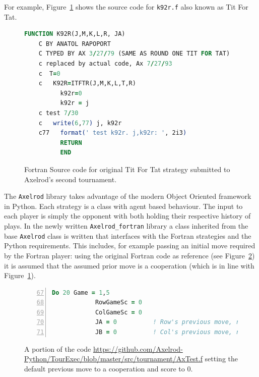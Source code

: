 \documentclass{article}
\begin{document}
For example, Figure~\ref{fig:tft_fortran} shows the source code for
\texttt{k92r.f} also known as Tit For Tat.

\begin{figure}[!hbtp]
    \begin{center}
        \begin{lstlisting}[language=Fortran,
                           basicstyle=\ttfamily,
                           frame=single,
                           keywordstyle=\color{red},
                           commentstyle=\color{green}]
          FUNCTION K92R(J,M,K,L,R, JA)
    C BY ANATOL RAPOPORT
    C TYPED BY AX 3/27/79 (SAME AS ROUND ONE TIT FOR TAT)
    c replaced by actual code, Ax 7/27/93
    c  T=0
    c   K92R=ITFTR(J,M,K,L,T,R)
          k92r=0
          k92r = j
    c test 7/30
    c   write(6,77) j, k92r
    c77   format(' test k92r. j,k92r: ', 2i3)
          RETURN
          END
        \end{lstlisting}
        \caption{Fortran Source code for original Tit For Tat strategy submitted
        to Axelrod's second tournament.}
        \label{fig:tft_fortran}
    \end{center}
\end{figure}


The \texttt{Axelrod} library takes advantage of the modern Object Oriented
framework in Python. Each strategy is a class with agent based behaviour. The
input to each player is simply the opponent with both holding their respective
history of plays. In the newly written \texttt{Axelrod\_fortran} library a
class inherited from the base \texttt{Axelrod} class is written that interfaces
with the Fortran strategies and the Python requirements. This includes, for
example passing an initial move required by the Fortran player: using the
original Fortran code as reference (see Figure~\ref{fig:tournament_code}) it
is assumed that the assumed prior move is
a cooperation (which is in line with Figure~\ref{fig:tft_fortran}).

\begin{figure}[!hbtp]
    \begin{center}
        \begin{lstlisting}[language=Fortran,
                           basicstyle=\ttfamily,
                           frame=single,
                           keywordstyle=\color{red},
                           numbers=left,
                           firstnumber=67,
                           commentstyle=\color{green}]
      Do 20 Game = 1,5
            RowGameSc = 0
            ColGameSc = 0
            JA = 0          ! Row's previous move, reported to column
            JB = 0          ! Col's previous move, reported to row
        \end{lstlisting}
        \caption{A portion of the code
            \url{https://github.com/Axelrod-Python/TourExec/blob/master/src/tournament/AxTest.f}
            setting the default
        previous move to a cooperation and score to 0.}
        \label{fig:tournament_code}
    \end{center}
\end{figure}
\end{document}
